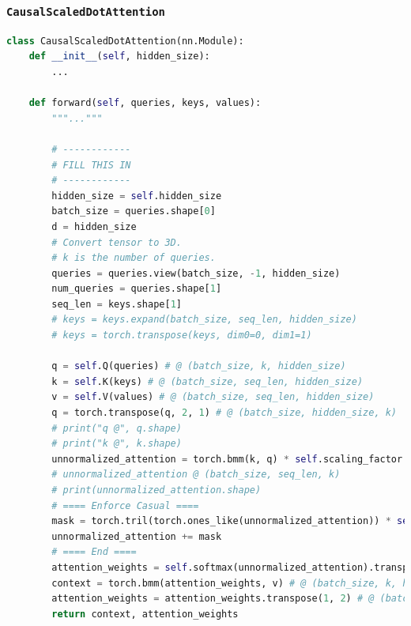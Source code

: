 \documentclass{article}
\begin{document}
\subsubsection{\texttt{CausalScaledDotAttention}}
\begin{lstlisting}[language=python]
class CausalScaledDotAttention(nn.Module):
    def __init__(self, hidden_size):
        ...

    def forward(self, queries, keys, values):
        """..."""

        # ------------
        # FILL THIS IN
        # ------------
        hidden_size = self.hidden_size
        batch_size = queries.shape[0]
        d = hidden_size
        # Convert tensor to 3D.
        # k is the number of queries.
        queries = queries.view(batch_size, -1, hidden_size)
        num_queries = queries.shape[1]
        seq_len = keys.shape[1]
        # keys = keys.expand(batch_size, seq_len, hidden_size)
        # keys = torch.transpose(keys, dim0=0, dim1=1)

        q = self.Q(queries) # @ (batch_size, k, hidden_size)
        k = self.K(keys) # @ (batch_size, seq_len, hidden_size)
        v = self.V(values) # @ (batch_size, seq_len, hidden_size)
        q = torch.transpose(q, 2, 1) # @ (batch_size, hidden_size, k)
        # print("q @", q.shape)
        # print("k @", k.shape)
        unnormalized_attention = torch.bmm(k, q) * self.scaling_factor
        # unnormalized_attention @ (batch_size, seq_len, k)
        # print(unnormalized_attention.shape)
        # ==== Enforce Casual ====
        mask = torch.tril(torch.ones_like(unnormalized_attention)) * self.neg_inf
        unnormalized_attention += mask
        # ==== End ====
        attention_weights = self.softmax(unnormalized_attention).transpose(1, 2) # @ (batch_size, k, seq_len)
        context = torch.bmm(attention_weights, v) # @ (batch_size, k, hidden_size)
        attention_weights = attention_weights.transpose(1, 2) # @ (batch_size, seq_len, k)
        return context, attention_weights
\end{lstlisting}
\end{document}
